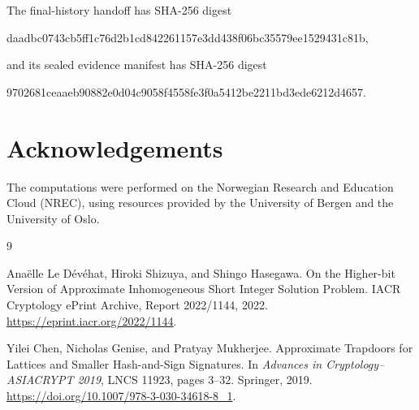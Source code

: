 \documentclass[10pt,a4paper]{article}
\begin{document}
The final-history handoff has SHA-256 digest
\begin{center}
\small\ttfamily
daadbc0743cb5ff1c76d2b1cd842261157e3dd438f06bc35579ee1529431c81b,
\end{center}
and its sealed evidence manifest has SHA-256 digest
\begin{center}
\small\ttfamily
9702681ceaaeb90882e0d04c9058f4558fe3f0a5412be2211bd3ede6212d4657.
\end{center}

\section*{Acknowledgements}
The computations were performed on the Norwegian Research and Education Cloud (NREC), using resources provided by the University of Bergen and the University of Oslo.

\begin{thebibliography}{9}

Anaëlle Le Dévéhat, Hiroki Shizuya, and Shingo Hasegawa.
\newblock On the Higher-bit Version of Approximate Inhomogeneous Short Integer
Solution Problem.
\newblock IACR Cryptology ePrint Archive, Report 2022/1144, 2022.
\newblock \url{https://eprint.iacr.org/2022/1144}.

Yilei Chen, Nicholas Genise, and Pratyay Mukherjee.
\newblock Approximate Trapdoors for Lattices and Smaller Hash-and-Sign
Signatures.
\newblock In \emph{Advances in Cryptology--ASIACRYPT 2019}, LNCS 11923,
pages 3--32. Springer, 2019.
\newblock \url{https://doi.org/10.1007/978-3-030-34618-8_1}.

\end{thebibliography}
\end{document}
